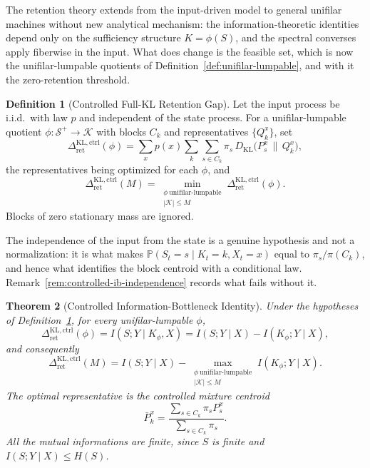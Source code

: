 \documentclass[12pt]{article}
\newtheorem{theorem}{Theorem}[section]
\theoremstyle{definition}
\newtheorem{definition}[theorem]{Definition}
\newcommand{\Splus}{\mathcal S^{+}}
\newcommand{\RetKLc}{\Delta_{\mathrm{ret}}^{\mathrm{KL,ctrl}}}
\begin{document}
The retention theory extends from the input-driven model to general unifilar
machines without new analytical mechanism: the information-theoretic identities
depend only on the sufficiency structure $K=\phi(S)$, and the spectral
converses apply fiberwise in the input.  What does change is the feasible set,
which is now the unifilar-lumpable quotients of
Definition~\ref{def:unifilar-lumpable}, and with it the zero-retention
threshold.

\begin{definition}[Controlled Full-KL Retention Gap]
\label{def:controlled-full-kl}
Let the input process be i.i.d.\ with law $p$ and independent of the state
process.  For a unifilar-lumpable quotient $\phi:\Splus\to\mathcal K$ with
blocks $C_k$ and representatives $\{Q_k^x\}$, set
\[
\RetKLc(\phi)
=
\sum_xp(x)\sum_k\sum_{s\in C_k}\pi_s\,
D_{\mathrm{KL}}\bigl(P_s^x\,\big\|\,Q_k^x\bigr),
\]
the representatives being optimized for each $\phi$, and
\[
\RetKLc(M)
=
\min_{\substack{\phi\ \text{unifilar-lumpable}\\ |\mathcal K|\le M}}
\RetKLc(\phi).
\]
Blocks of zero stationary mass are ignored.
\end{definition}

The independence of the input from the state is a genuine hypothesis and not a
normalization: it is what makes $\mathbb P(S_t=s\mid K_t=k,X_t=x)$ equal to
$\pi_s/\pi(C_k)$, and hence what identifies the block centroid with a
conditional law.  Remark~\ref{rem:controlled-ib-independence} records what
fails without it.

\begin{theorem}[Controlled Information-Bottleneck Identity]
\label{thm:controlled-ib}
Under the hypotheses of Definition~\ref{def:controlled-full-kl}, for every
unifilar-lumpable $\phi$,
\[
\RetKLc(\phi)
=
I(S;Y\mid K_\phi,X)
=
I(S;Y\mid X)-I(K_\phi;Y\mid X),
\]
and consequently
\[
\RetKLc(M)
=
I(S;Y\mid X)
-
\max_{\substack{\phi\ \text{unifilar-lumpable}\\|\mathcal K|\le M}}
I(K_\phi;Y\mid X).
\]
The optimal representative is the controlled mixture centroid
\[
\bar P_k^x
=
\frac{\sum_{s\in C_k}\pi_sP_s^x}{\sum_{s\in C_k}\pi_s}.
\]
All the mutual informations are finite, since $S$ is finite and
$I(S;Y\mid X)\le H(S)$.
\end{theorem}
\end{document}
